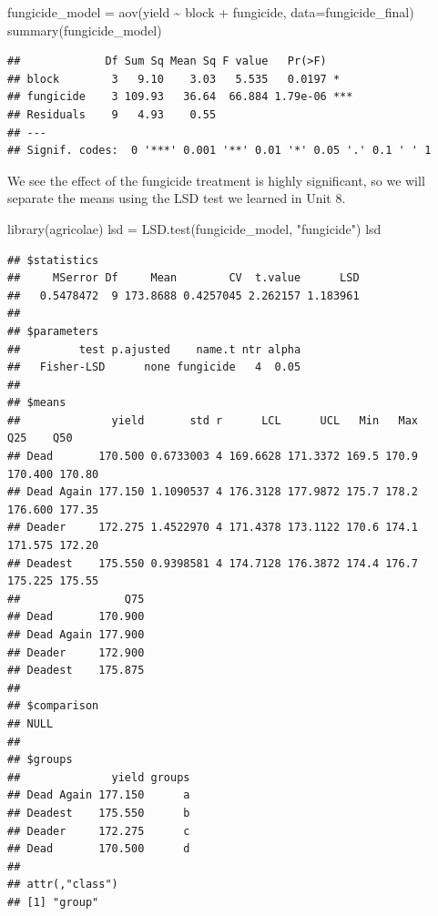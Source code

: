 \documentclass[
]{book}
\newenvironment{Shaded}{\begin{snugshade}}{\end{snugshade}}
\newcommand{\AttributeTok}[1]{\textcolor[rgb]{0.77,0.63,0.00}{#1}}
\newcommand{\FunctionTok}[1]{\textcolor[rgb]{0.00,0.00,0.00}{#1}}
\newcommand{\NormalTok}[1]{#1}
\newcommand{\OtherTok}[1]{\textcolor[rgb]{0.56,0.35,0.01}{#1}}
\newcommand{\SpecialCharTok}[1]{\textcolor[rgb]{0.00,0.00,0.00}{#1}}
\newcommand{\StringTok}[1]{\textcolor[rgb]{0.31,0.60,0.02}{#1}}
\begin{document}
\begin{Shaded}
\begin{Highlighting}[]
\NormalTok{fungicide\_model }\OtherTok{=} \FunctionTok{aov}\NormalTok{(yield }\SpecialCharTok{\textasciitilde{}}\NormalTok{ block }\SpecialCharTok{+}\NormalTok{ fungicide, }\AttributeTok{data=}\NormalTok{fungicide\_final)}
\FunctionTok{summary}\NormalTok{(fungicide\_model)}
\end{Highlighting}
\end{Shaded}

\begin{verbatim}
##             Df Sum Sq Mean Sq F value   Pr(>F)    
## block        3   9.10    3.03   5.535   0.0197 *  
## fungicide    3 109.93   36.64  66.884 1.79e-06 ***
## Residuals    9   4.93    0.55                     
## ---
## Signif. codes:  0 '***' 0.001 '**' 0.01 '*' 0.05 '.' 0.1 ' ' 1
\end{verbatim}

We see the effect of the fungicide treatment is highly significant, so we will separate the means using the LSD test we learned in Unit 8.

\begin{Shaded}
\begin{Highlighting}[]
\FunctionTok{library}\NormalTok{(agricolae)}
\NormalTok{lsd }\OtherTok{=} \FunctionTok{LSD.test}\NormalTok{(fungicide\_model, }\StringTok{"fungicide"}\NormalTok{)}
\NormalTok{lsd}
\end{Highlighting}
\end{Shaded}

\begin{verbatim}
## $statistics
##     MSerror Df     Mean        CV  t.value      LSD
##   0.5478472  9 173.8688 0.4257045 2.262157 1.183961
## 
## $parameters
##         test p.ajusted    name.t ntr alpha
##   Fisher-LSD      none fungicide   4  0.05
## 
## $means
##              yield       std r      LCL      UCL   Min   Max     Q25    Q50
## Dead       170.500 0.6733003 4 169.6628 171.3372 169.5 170.9 170.400 170.80
## Dead Again 177.150 1.1090537 4 176.3128 177.9872 175.7 178.2 176.600 177.35
## Deader     172.275 1.4522970 4 171.4378 173.1122 170.6 174.1 171.575 172.20
## Deadest    175.550 0.9398581 4 174.7128 176.3872 174.4 176.7 175.225 175.55
##                Q75
## Dead       170.900
## Dead Again 177.900
## Deader     172.900
## Deadest    175.875
## 
## $comparison
## NULL
## 
## $groups
##              yield groups
## Dead Again 177.150      a
## Deadest    175.550      b
## Deader     172.275      c
## Dead       170.500      d
## 
## attr(,"class")
## [1] "group"
\end{verbatim}
\end{document}
